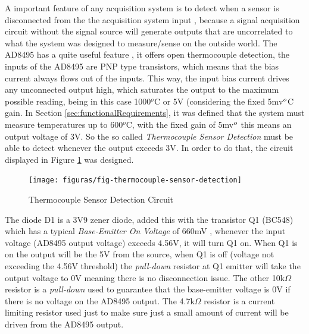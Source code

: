 	A important feature of any acquisition system is to detect when a sensor is disconnected from the the acquisition system input \cite{o2011pressure}, because a signal acquisition circuit without the signal source will generate outputs that are uncorrelated to what the system was designed to measure/sense on the outside world. The AD8495 has a quite useful feature \cite{ad8495-datasheet}, it offers open thermocouple detection, the inputs of the AD8495 are PNP type transistors, which means that the bias current always flows out of the inputs. This way, the input bias current drives any unconnected output high, which saturates the output to the maximum possible reading, being in this case 1000$^{o}$C or 5V (considering the fixed 5mv$\/ ^{o}$C gain. In Section \ref{sec:functionalRequirements}, it was defined that the system must measure temperatures up to 600$^{o}$C, with the fixed gain of 5mv$\/^{o}$ this means an output voltage of 3V. So the so called \textit{Thermocouple Sensor Detection} must be able to detect whenever the output exceeds 3V. In order to do that, the circuit displayed in Figure \ref{fig:thermocouple-sensor-detection} was designed.
	
		\begin{figure}[htbp]
			\centering
				\texttt{[image: figuras/fig-thermocouple-sensor-detection]}
			\caption{Thermocouple Sensor Detection Circuit}
			\label{fig:thermocouple-sensor-detection}
		\end{figure}
		
	The diode D1 is a 3V9 zener diode, added this with the transistor Q1 (BC548) which has a typical \textit{Base-Emitter On Voltage} of 660mV \cite{bc548 }, whenever the input voltage (AD8495 output voltage) exceeds 4.56V, it will turn Q1 on. When Q1 is on the output will be the 5V from the source, when Q1 is off (voltage not exceeding the 4.56V threshold) the \textit{pull-down} resistor at Q1 emitter will take the output voltage to 0V meaning there is no disconnection issue. The other 10k$\Omega$ resistor is a \textit{pull-down} used to guarantee that the base-emitter voltage is 0V if there is no voltage on the AD8495 output. The 4.7k$\Omega$ resistor is a current limiting resistor used just to make sure just a small amount of current will be driven from the AD8495 output.

	
